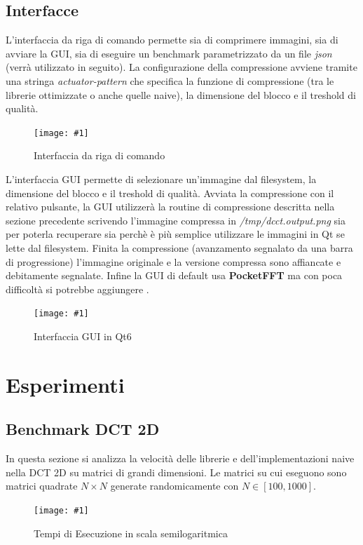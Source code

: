 \documentclass[a4paper,11pt,oneside, table]{article}
\newcommand{\putimage}[4] {
	\begin{figure}[H]
	    \centering
	    \texttt{[image: \#1]}
	    \caption{#2}\label{#3}
	\end{figure}
}
\begin{document}
\pagebreak

\subsection{Interfacce}

L'interfaccia da riga di comando permette sia di comprimere immagini, sia di avviare la GUI, sia di eseguire un benchmark parametrizzato da un file \textit{json} (verr\`a utilizzato in seguito).
La configurazione della compressione avviene tramite una stringa \textit{actuator-pattern} che specifica la funzione di compressione (tra le librerie ottimizzate o anche quelle naive), la dimensione del blocco e il treshold di qualit\`a.

\putimage{images/interface-cli.png}{Interfaccia da riga di comando}{png:interface_cli}{0.99}

L'interfaccia GUI permette di selezionare un'immagine dal filesystem, la dimensione del blocco e il treshold di qualit\`a.
Avviata la compressione con il relativo pulsante, la GUI utilizzer\`a la routine di compressione descritta nella sezione precedente scrivendo l'immagine compressa in \textit{/tmp/dcct.output.png} sia per poterla recuperare sia perch\`e \`e pi\`u semplice utilizzare le immagini in Qt se lette dal filesystem.
Finita la compressione (avanzamento segnalato da una barra di progressione) l'immagine originale e la versione compressa sono affiancate e debitamente segnalate.
Infine la GUI di default usa \textbf{PocketFFT} ma con poca difficolt\`a si potrebbe aggiungere .

\putimage{images/interface-gui.png}{Interfaccia GUI in Qt6}{png:interface_gui}{0.99}

\section{Esperimenti}

\subsection{Benchmark DCT 2D}

In questa sezione si analizza la velocit\`a delle librerie e dell'implementazioni naive nella DCT 2D su matrici di grandi dimensioni.
Le matrici su cui eseguono sono matrici quadrate $N \times N$ generate randomicamente con $N \in [100, 1000]$.

\putimage{images/actuator-trends.png}{Tempi di Esecuzione in scala semilogaritmica}{png:actuator-trends}{0.99}
\end{document}

